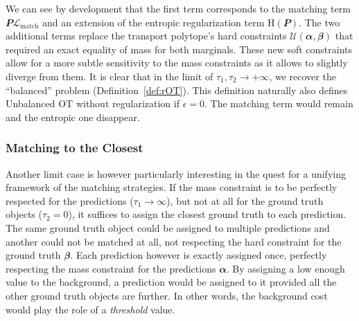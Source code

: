 We can see by development that the first term corresponds to the matching term $\mathbfit{P}\mathcal{L}_{\text{match}}$ and an extension of the entropic regularization term $\mathrm{H}(\mathbfit{P})$. The two additional terms replace the transport polytope's hard constraints $\mathcal{U}(\mathbfit{\alpha},\mathbfit{\beta})$ that required an exact equality of mass for both marginals. These new soft constraints allow for a more subtle sensitivity to the mass constraints as it allows to slightly diverge from them. It is clear that in the limit of $\tau_1, \tau_2 \rightarrow +\infty$, we recover the ``balanced'' problem (Definition~\ref{def:rOT}). This definition naturally also defines Unbalanced OT without regularization if $\epsilon = 0$. The matching term would remain and the entropic one disappear.

\subsubsection{Matching to the Closest} Another limit case is however particularly interesting in the quest for a unifying framework of the matching strategies. If the mass constraint is to be perfectly respected for the predictions ($\tau_1 \rightarrow \infty$), but not at all for the ground truth objects ($\tau_2 = 0$), it suffices to assign the closest ground truth to each prediction. The same ground truth object could be assigned to multiple predictions and another could not be matched at all, not respecting the hard constraint for the ground truth $\mathbfit{\beta}$. Each prediction however is exactly assigned once, perfectly respecting the mass constraint for the predictions $\mathbfit{\alpha}$. By assigning a low enough value to the background, a prediction would be assigned to it provided all the other ground truth objects are further. In other words, the background cost would play the role of a \emph{threshold} value.

